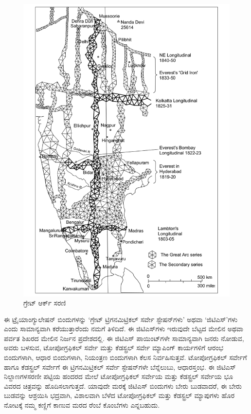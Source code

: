 \begin{figure}[!htbp]
\includegraphics[scale=1.22]{"images/image004.jpg"}
\caption{ಗ್ರೇಟ್ ಆರ್ಕ್ ಸರಣಿ}\label{chap3-fig02}
\end{figure}

ಈ ಟ್ರೈಯಾಂಗ್ಯುಲೇಷನ್​ ಬಿಂದುಗಳನ್ನು ‘ಗ್ರೇಟ್​ ಟ್ರಿಗನಮಿಟ್ರಿಕಲ್​ ಸರ್ವೇ ಸ್ಟೇಷನ್​\break ಗಳು’ ಅಥವಾ ‘ಜಿಟಿಎಸ್​’ಗಳು ಎಂದು ಸಾಮಾನ್ಯವಾಗಿ ಕರೆಯುತ್ತಾರೆಂದು ನಮಗೆ ತಿಳಿದಿದೆ. ಈ ಜಿಟಿಎಸ್​ಗಳು ಇರುವುದೇ ಬೆಟ್ಟದ ಮೇಲಿನ ಅಥವಾ ಪರ್ವತ ಶಿಖರದ ಮೇಲಿನ ನಿರ್ಜನ ಪ್ರದೇಶದಲ್ಲಿ. ಈ ಜಿಟಿಎಸ್​ ಪಾಯಿಂಟ್​ಗಳೇ ಸಾಮಾನ್ಯವಾಗಿ ಜನರು ನೋಡುವ, ಅವರು ಬಳಸುವ, ಟೋಪೋಗ್ರಫಿಕಲ್​ ಸರ್ವೇ ಮತ್ತು ಕೆಡಸ್ಟ್ರಲ್​ ಸರ್ವೇ ಮ್ಯಾಪಿಂಗ್​ ಕಾರ್ಯಗಳಿಗೆ ಆರಂಭ ಬಿಂದುಗಳಾಗಿ, ಆಧಾರ ಬಿಂದುಗಳಾಗಿ, ನಿಯಂತ್ರಣ ಬಿಂದುಗಳಾಗಿ ಕೆಲಸ ನಿರ್ವಹಿಸುತ್ತವೆ. ಟೋಪೋಗ್ರಫಿಕಲ್​ ಸರ್ವೇಗೆ ಹಾಗೂ ಕೆಡಸ್ಟ್ರಲ್​ ಸರ್ವೇಗೆ ಈ ಟ್ರಿಗನಮಿಟ್ರಿಕಲ್​ ಸರ್ವೇ ಸ್ಟೇಷನ್​ಗಳೇ ಬೆನ್ನೆಲುಬು, ಆಧಾರಸ್ತಂಭ. ಈ ಜಿಟಿಎಸ್​ ನಿಲ್ದಾಣಗಳ\break ಸರಣೀ ಪಟ್ಟಿಯ ಹಂದರದ ಮೇಲೆ ಟೋಪೋಗ್ರಫಿಕಲ್​ ಸರ್ವೇಯ ಮತ್ತು ಕೆಡಸ್ಟ್ರಲ್​ ಸರ್ವೇಯ ಭೂ ವಿವರದ ಚಿತ್ರವನ್ನು ಹೊದಿಸಲಾಗುತ್ತದೆ. ಯಾವುದೇ ಮರಕ್ಕೆ ಜಿಟಿಎಸ್​ ಬಿಂದುಗಳು ಬೇರು ಬುಡವಾದರೆ, ಈ ಬೇರು ಬುಡವನ್ನು ಆಶ್ರಯಿಸಿ ಭದ್ರವಾಗಿ, ವಿಶಾಲವಾಗಿ ಬೆಳೆದ ಟೋಪೋಗ್ರಫಿಕಲ್​ ಮತ್ತು ಕೆಡಸ್ಟ್ರಲ್​ ಮ್ಯಾಪುಗಳು ಹೊರ ನೋಟಕ್ಕೆ ನಮ್ಮ ಕಣ್ಣಿಗೆ ಕಾಣುವ ಮರದ ರೆಂಬೆ ಕೊಂಬೆಗಳು ಎನ್ನಬಹುದು.

